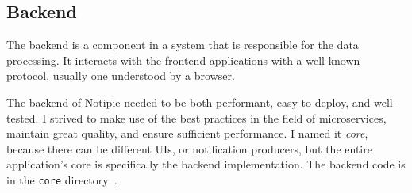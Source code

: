 \subsection{Backend}\label{sec:backend}

The backend is a component in a system
that is responsible for the data processing.
It interacts with the frontend applications
with a well-known protocol,
usually one understood by a browser.

The backend of Notipie
needed to be both performant,
easy to deploy,
and well-tested.
I strived to make use of the best practices
in the field of microservices,
maintain great quality,
and ensure sufficient performance.
I named it \textit{core},
because there can be different \acp{UI},
or notification producers,
but the entire application's core
is specifically the backend implementation.
The backend code
is in the
\texttt{core} directory~\cite{sewera_notipie_2022}.




